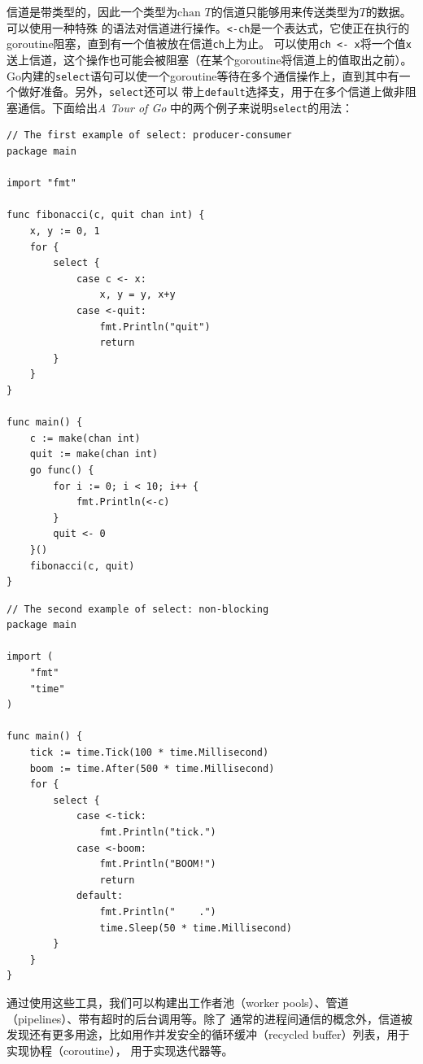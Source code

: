 \documentclass[12pt]{article}
\begin{document}
\indent{}信道是带类型的，因此一个类型为$\textrm{chan }T$的信道只能够用来传送类型为$T$的数据。可以使用一种特殊
的语法对信道进行操作。\texttt{<-ch}是一个表达式，它使正在执行的goroutine阻塞，直到有一个值被放在信道\texttt{ch}上为止。
可以使用\texttt{ch <- x}将一个值\texttt{x}送上信道，这个操作也可能会被阻塞（在某个goroutine将信道上的值取出之前）。
Go内建的\texttt{select}语句可以使一个goroutine等待在多个通信操作上，直到其中有一个做好准备。另外，\texttt{select}还可以
带上\texttt{default}选择支，用于在多个信道上做非阻塞通信。下面给出\textit{A Tour of Go} 中的两个例子来说明\texttt{select}的用法：
\begin{verbatim}
// The first example of select: producer-consumer
package main

import "fmt"

func fibonacci(c, quit chan int) {
    x, y := 0, 1
    for {
        select {
            case c <- x:
                x, y = y, x+y
            case <-quit:
                fmt.Println("quit")
                return
        }
    }
}

func main() {
    c := make(chan int)
    quit := make(chan int)
    go func() {
        for i := 0; i < 10; i++ {
            fmt.Println(<-c)
        }
        quit <- 0
    }()
    fibonacci(c, quit)
}
\end{verbatim}

\begin{verbatim}
// The second example of select: non-blocking
package main

import (
    "fmt"
    "time"
)

func main() {
    tick := time.Tick(100 * time.Millisecond)
    boom := time.After(500 * time.Millisecond)
    for {
        select {
            case <-tick:
                fmt.Println("tick.")
            case <-boom:
                fmt.Println("BOOM!")
                return
            default:
                fmt.Println("    .")
                time.Sleep(50 * time.Millisecond)
        }
    }
}
\end{verbatim}

\indent{}通过使用这些工具，我们可以构建出工作者池（worker pools）、管道（pipelines）、带有超时的后台调用等。除了
通常的进程间通信的概念外，信道被发现还有更多用途，比如用作并发安全的循环缓冲（recycled buffer）列表，用于实现协程（coroutine），
用于实现迭代器等。
\end{document}
